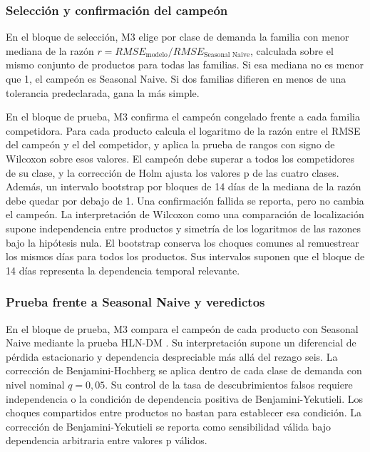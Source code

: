 \subsubsection{Selección y confirmación del campeón}
En el bloque de selección, M3 elige por clase de demanda la familia con menor mediana de la razón $r = RMSE_{\text{modelo}} / RMSE_{\text{Seasonal Naive}}$, calculada sobre el mismo conjunto de productos para todas las familias. Si esa mediana no es menor que 1, el campeón es Seasonal Naive. Si dos familias difieren en menos de una tolerancia predeclarada, gana la más simple.

En el bloque de prueba, M3 confirma el campeón congelado frente a cada familia competidora. Para cada producto calcula el logaritmo de la razón entre el RMSE del campeón y el del competidor, y aplica la prueba de rangos con signo de Wilcoxon \cite{wilcoxon1945} sobre esos valores. El campeón debe superar a todos los competidores de su clase, y la corrección de Holm \cite{holm1979} ajusta los valores p de las cuatro clases. Además, un intervalo bootstrap por bloques de 14 días de la mediana de la razón debe quedar por debajo de 1. Una confirmación fallida se reporta, pero no cambia el campeón. La interpretación de Wilcoxon como una comparación de localización supone independencia entre productos y simetría de los logaritmos de las razones bajo la hipótesis nula. El bootstrap conserva los choques comunes al remuestrear los mismos días para todos los productos. Sus intervalos suponen que el bloque de 14 días representa la dependencia temporal relevante.

\subsubsection{Prueba frente a Seasonal Naive y veredictos}
En el bloque de prueba, M3 compara el campeón de cada producto con Seasonal Naive mediante la prueba HLN-DM \cite{dm,harvey1997}. Su interpretación supone un diferencial de pérdida estacionario y dependencia despreciable más allá del rezago seis. La corrección de Benjamini-Hochberg \cite{benjamini1995} se aplica dentro de cada clase de demanda con nivel nominal $q = 0{,}05$. Su control de la tasa de descubrimientos falsos requiere independencia o la condición de dependencia positiva de Benjamini-Yekutieli. Los choques compartidos entre productos no bastan para establecer esa condición. La corrección de Benjamini-Yekutieli se reporta como sensibilidad válida bajo dependencia arbitraria entre valores p válidos.

